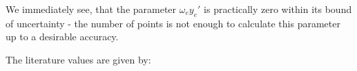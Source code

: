 We immediately see, that the parameter $\omega_e y_e'$ is practically zero within its 
bound of uncertainty - the number of points is not enough to calculate this parameter 
up to a desirable accuracy. 


The literature values are given by:

